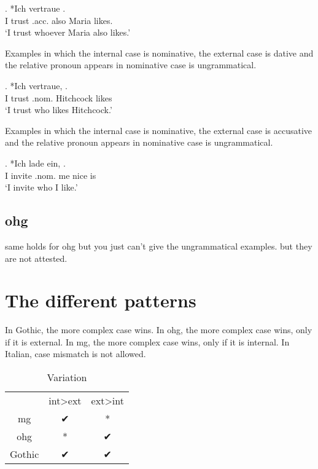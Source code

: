 \exg. *Ich vertraue    . \\
 I trust\scsub{[dat]} .\ac{acc}. also Maria likes\scsub{[acc]}.\\
 `I trust whoever Maria also likes.' 

Examples in which the internal case is nominative, the external case is dative and the relative pronoun appears in nominative case is ungrammatical.

\exg. *Ich vertraue,   .\\
 I trust\scsub{[dat]} .\ac{nom}. Hitchcock likes\scsub{[nom]}\\
 `I trust who likes Hitchcock.' 

Examples in which the internal case is nominative, the external case is accusative and the relative pronoun appears in nominative case is ungrammatical.

\exg. *Ich {lade ein},    .\\
 I invite\scsub{[acc]} .\ac{nom}. me nice is\scsub{[nom]}\\
 `I invite who I like.' 




\subsection{\ac{ohg}}

same holds for \ac{ohg} but you just can't give the ungrammatical examples. but they are not attested.



\section{The different patterns}

In Gothic, the more complex case wins.
In \ac{ohg}, the more complex case wins, only if it is external.
In \ac{mg}, the more complex case wins, only if it is internal.
In Italian, case mismatch is not allowed.


\begin{table}[H]
	\center
	\caption {Variation}
		\begin{tabular}{ccc}
		\toprule
		 					& \ac{int}>\ac{ext}		& \ac{ext}>\ac{int}	\\
								\cmidrule{2-3}
		\ac{mg} 	& ✔			 							&	*									\\
		\ac{ohg}	& *										&	✔									\\
		Gothic		&	✔										&	✔									\\
		\bottomrule
		\end{tabular}
\end{table}



